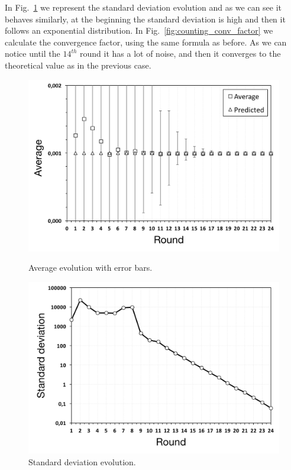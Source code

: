 In Fig.~\ref{fig:counting_standard_deviation} we represent the standard deviation evolution and as we can see it behaves similarly, at the beginning the standard deviation is high and then it follows an exponential distribution. In Fig.~\ref{fig:counting_conv_factor} we calculate the convergence factor, using the same formula as before. As we can notice until the $14^{th}$ round it has a lot of noise, and then it converges to the theoretical value as in the previous case.

\begin{figure}[p]
\centering
\includegraphics[keepaspectratio=true, width=\textwidth]{images/counting_average}
\caption{Average evolution with error bars.}
\label{fig:counting_average}
\includegraphics[keepaspectratio=true, width=\textwidth]{images/counting_standard_deviation}
\caption{Standard deviation evolution.}
\label{fig:counting_standard_deviation}
\end{figure}


